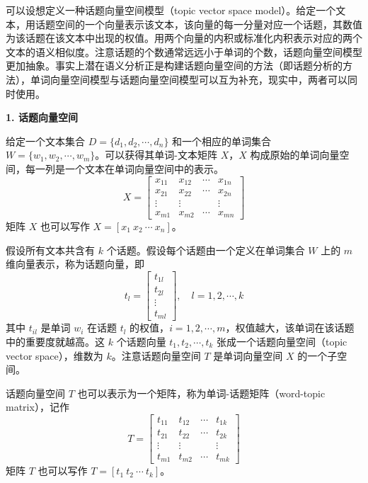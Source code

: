 \documentclass[UTF8,12pt,a4paper,fontset=fandol]{ctexart}
\begin{document}
可以设想定义一种话题向量空间模型（topic vector space model）。给定一个文本，用话题空间的一个向量表示该文本，该向量的每一分量对应一个话题，其数值为该话题在该文本中出现的权值。用两个向量的内积或标准化内积表示对应的两个文本的语义相似度。注意话题的个数通常远远小于单词的个数，话题向量空间模型更加抽象。事实上潜在语义分析正是构建话题向量空间的方法（即话题分析的方法），单词向量空间模型与话题向量空间模型可以互为补充，现实中，两者可以同时使用。

\noindent\textbf{1. 话题向量空间}

给定一个文本集合 $D=\{d_1,d_2,\cdots,d_n\}$ 和一个相应的单词集合 $W=\{w_1,w_2,\cdots,w_m\}$。可以获得其单词-文本矩阵 $X$，$X$ 构成原始的单词向量空间，每一列是一个文本在单词向量空间中的表示。
\begin{equation}
X=
\begin{bmatrix}
x_{11} & x_{12} & \cdots & x_{1n}\\
x_{21} & x_{22} & \cdots & x_{2n}\\
\vdots & \vdots & & \vdots\\
x_{m1} & x_{m2} & \cdots & x_{mn}
\end{bmatrix}
\tag{17.5}
\end{equation}
矩阵 $X$ 也可以写作 $X=[x_1\ x_2\ \cdots\ x_n]$。

假设所有文本共含有 $k$ 个话题。假设每个话题由一个定义在单词集合 $W$ 上的 $m$ 维向量表示，称为话题向量，即
\begin{equation}
t_l=
\begin{bmatrix}
t_{1l}\\
t_{2l}\\
\vdots\\
t_{ml}
\end{bmatrix},
\quad l=1,2,\cdots,k
\tag{17.6}
\end{equation}
其中 $t_{il}$ 是单词 $w_i$ 在话题 $t_l$ 的权值，$i=1,2,\cdots,m$，权值越大，该单词在该话题中的重要度就越高。这 $k$ 个话题向量 $t_1,t_2,\cdots,t_k$ 张成一个话题向量空间（topic vector space），维数为 $k$。注意话题向量空间 $T$ 是单词向量空间 $X$ 的一个子空间。

话题向量空间 $T$ 也可以表示为一个矩阵，称为单词-话题矩阵（word-topic matrix），记作
\begin{equation}
T=
\begin{bmatrix}
t_{11} & t_{12} & \cdots & t_{1k}\\
t_{21} & t_{22} & \cdots & t_{2k}\\
\vdots & \vdots & & \vdots\\
t_{m1} & t_{m2} & \cdots & t_{mk}
\end{bmatrix}
\tag{17.7}
\end{equation}
矩阵 $T$ 也可以写作 $T=[t_1\ t_2\ \cdots\ t_k]$。
\end{document}
